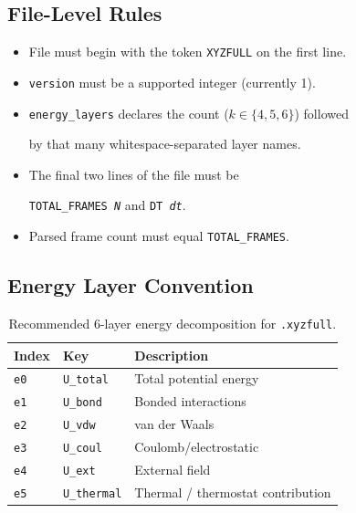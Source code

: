 \documentclass[12pt, a4paper, oneside]{article}
\begin{document}
\subsection{File-Level Rules}


\begin{itemize}

  \item File must begin with the token \texttt{XYZFULL} on the first line.

  \item \texttt{version} must be a supported integer (currently 1).

  \item \texttt{energy\_layers} declares the count ($k \in \{4, 5, 6\}$) followed

        by that many whitespace-separated layer names.

  \item The final two lines of the file must be

        \texttt{TOTAL\_FRAMES \textit{N}} and \texttt{DT \textit{dt}}.

  \item Parsed frame count must equal \texttt{TOTAL\_FRAMES}.

\end{itemize}


\subsection{Energy Layer Convention}


\begin{table}[htbp]

  \centering

  \caption{Recommended 6-layer energy decomposition for \texttt{.xyzfull}.}

  \label{tab:xyzfull_energy}

  \begin{tabular}{lll}

    \toprule

    Index & Key & Description \\

    \midrule

    \texttt{e0} & \texttt{U\_total}   & Total potential energy \\

    \texttt{e1} & \texttt{U\_bond}    & Bonded interactions \\

    \texttt{e2} & \texttt{U\_vdw}     & van der Waals \\

    \texttt{e3} & \texttt{U\_coul}    & Coulomb/electrostatic \\

    \texttt{e4} & \texttt{U\_ext}     & External field \\

    \texttt{e5} & \texttt{U\_thermal} & Thermal / thermostat contribution \\

    \bottomrule

  \end{tabular}

\end{table}
\end{document}
